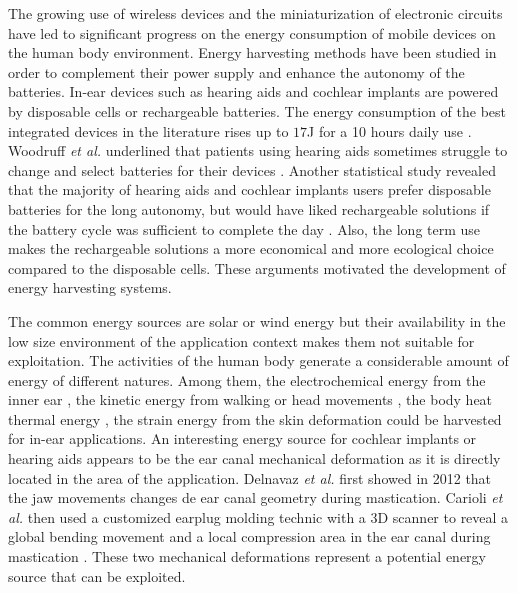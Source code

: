 \documentclass[3p,twocolumn,preprint]{elsarticle}
\begin{document}
The growing use of wireless devices and the miniaturization of electronic circuits have led to significant progress on the energy consumption of mobile devices on the human body environment. Energy harvesting methods have been studied in order to complement their power supply and enhance the autonomy of the batteries. In-ear devices such as hearing aids and cochlear implants are powered by disposable cells or rechargeable batteries. The energy consumption of the best integrated devices in the literature rises up to $17$J for a 10 hours daily use \cite{Scherer2019,Yip2015,Kulah2022}. Woodruff \emph{et al.} underlined that patients using hearing aids sometimes struggle to change and select batteries for their devices \cite{Woodruff2021}. Another statistical study revealed that the majority of hearing aids and cochlear implants users prefer disposable batteries for the long autonomy, but would have liked rechargeable solutions if the battery cycle was sufficient to complete the day \cite{PracticesAudiology2016}. Also, the long term use makes the rechargeable solutions a more economical and more ecological choice compared to the disposable cells. These arguments motivated the development of energy harvesting systems.

The common energy sources are solar or wind energy but their availability in the low size environment of the application context makes them not suitable for exploitation. The activities of the human body generate a considerable amount of energy of different natures. Among them, the electrochemical energy from the inner ear \cite{Mercier2012}, the kinetic energy from walking or head movements \cite{Azimi2021,Smilek2016}, the body heat thermal energy \cite{Kim2014}, the strain energy from the skin deformation \cite{Jin2021} could be harvested for in-ear applications. An interesting energy source for cochlear implants or hearing aids appears to be the ear canal mechanical deformation as it is directly located in the area of the application. Delnavaz \emph{et al.} first showed in 2012 that the jaw movements changes de ear canal geometry during mastication. Carioli \emph{et al.} then used a customized earplug molding technic with a 3D scanner to reveal a global bending movement and a local compression area in the ear canal during mastication \cite{Carioli2016}. These two mechanical deformations represent a potential energy source that can be exploited.
\end{document}
